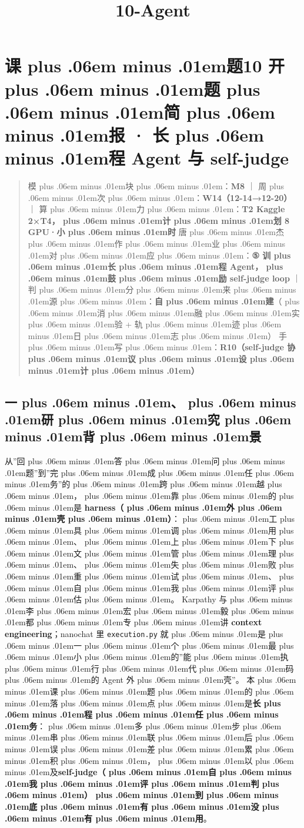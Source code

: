\documentclass[
]{article}
\title{\zh{课\zhglue 题}10-\zh{长\zhglue 程}Agent}
\author{}
\date{}
\newcommand{\passthrough}[1]{#1}
\def\zh#1{{\zhfont #1}}
\def\sym#1{{\symfont #1}}
\def\zhglue{\hskip0pt plus .06em minus .01em}
\begin{document}
\maketitle

{
\setcounter{tocdepth}{2}
\tableofcontents
}
\section{\zh{课\zhglue 题}10 \zh{开\zhglue 题\zhglue 简\zhglue 报} \sym{·} \zh{长\zhglue 程} Agent \zh{与} self-judge}\label{ux8bfeux989810-ux5f00ux9898ux7b80ux62a5-ux957fux7a0b-agent-ux4e0e-self-judge}

\begin{quote}
\zh{模\zhglue 块\zhglue ：}\textbf{M8} \zh{｜} \zh{周\zhglue 次\zhglue ：}\textbf{W14\zh{（}12-14\sym{→}12-20\zh{）}} \zh{｜} \zh{算\zhglue 力\zhglue ：}\textbf{T2 Kaggle 2\sym{×}T4\zh{，\zhglue 计\zhglue 划} 8 GPU\sym{·}\zh{小\zhglue 时}} \zh{唐\zhglue 杰\zhglue 作\zhglue 业\zhglue 对\zhglue 应\zhglue ：}\textbf{\sym{⑤} \zh{训\zhglue 长\zhglue 程} Agent\zh{，\zhglue 鼓\zhglue 励} self-judge loop} \zh{｜} \zh{判\zhglue 分\zhglue 来\zhglue 源\zhglue ：}\textbf{\zh{自\zhglue 建}}\zh{（\zhglue 消\zhglue 融\zhglue 实\zhglue 验} + \zh{轨\zhglue 迹\zhglue 日\zhglue 志\zhglue ）} \zh{手\zhglue 写\zhglue ：}\textbf{R10\zh{（}self-judge \zh{协\zhglue 议\zhglue 设\zhglue 计\zhglue ）}}
\end{quote}

\subsection{\zh{一\zhglue 、\zhglue 研\zhglue 究\zhglue 背\zhglue 景}}\label{ux4e00ux7814ux7a76ux80ccux666f}

\zh{从}''\zh{回\zhglue 答\zhglue 问\zhglue 题}''\zh{到}''\zh{完\zhglue 成\zhglue 任\zhglue 务}''\zh{的\zhglue 跨\zhglue 越\zhglue ，\zhglue 靠\zhglue 的\zhglue 是} \textbf{harness\zh{（\zhglue 外\zhglue 壳\zhglue ）}}\zh{：\zhglue 工\zhglue 具\zhglue 调\zhglue 用\zhglue 、\zhglue 上\zhglue 下\zhglue 文\zhglue 管\zhglue 理\zhglue 、\zhglue 失\zhglue 败\zhglue 重\zhglue 试\zhglue 、\zhglue 自\zhglue 我\zhglue 评\zhglue 估\zhglue 。} Karpathy \zh{与\zhglue 李\zhglue 宏\zhglue 毅\zhglue 都\zhglue 专\zhglue 讲} \textbf{context engineering}\zh{；}nanochat \zh{里} \passthrough{\lstinline!execution.py!} \zh{就\zhglue 是\zhglue 一\zhglue 个\zhglue 最\zhglue 小\zhglue 的}''\zh{能\zhglue 执\zhglue 行\zhglue 代\zhglue 码\zhglue 的} Agent \zh{外\zhglue 壳}''\zh{。} \zh{本\zhglue 课\zhglue 题\zhglue 的\zhglue 落\zhglue 点\zhglue 是}\textbf{\zh{长\zhglue 程\zhglue 任\zhglue 务}}\zh{：\zhglue 多\zhglue 步\zhglue 串\zhglue 联\zhglue 后\zhglue 误\zhglue 差\zhglue 累\zhglue 积\zhglue ，\zhglue 以\zhglue 及}\textbf{self-judge\zh{（\zhglue 自\zhglue 我\zhglue 评\zhglue 判\zhglue ）\zhglue 到\zhglue 底\zhglue 有\zhglue 没\zhglue 有\zhglue 用}}\zh{。}
\end{document}
